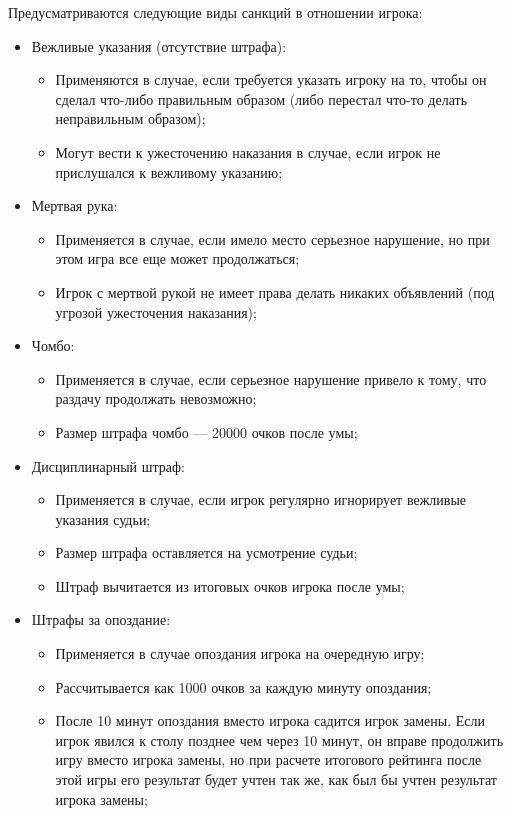 Предусматриваются следующие виды санкций в отношении игрока:
\begin{itemize}
	\item Вежливые указания (отсутствие штрафа):
	\begin{itemize}
		\item Применяются в случае, если требуется указать игроку на то, чтобы он сделал что-либо правильным образом (либо перестал что-то делать неправильным образом);
		\item Могут вести к ужесточению наказания в случае, если игрок не прислушался к вежливому указанию;
	\end{itemize}
	\item Мертвая рука:
	\begin{itemize}
		\item Применяется в случае, если имело место серьезное нарушение, но при этом игра все еще может продолжаться;
		\item Игрок с мертвой рукой не имеет права делать никаких объявлений (под угрозой ужесточения наказания);
	\end{itemize}
	\item Чомбо:
	\begin{itemize}
		\item Применяется в случае, если серьезное нарушение привело к тому, что раздачу продолжать невозможно;
		\item Размер штрафа чомбо --- 20000 очков после умы;
	\end{itemize}
	\item Дисциплинарный штраф:
	\begin{itemize}
		\item Применяется в случае, если игрок регулярно игнорирует вежливые указания судьи;
		\item Размер штрафа оставляется на усмотрение судьи;
		\item Штраф вычитается из итоговых очков игрока после умы;
	\end{itemize}
	\item Штрафы за опоздание:
	\begin{itemize}
		\item Применяется в случае опоздания игрока на очередную игру;
		\item Рассчитывается как 1000 очков за каждую минуту опоздания;
		\item После 10 минут опоздания вместо игрока садится игрок замены. Если игрок явился к столу позднее чем через 10 минут, он вправе продолжить игру вместо игрока замены, но при расчете итогового рейтинга после этой игры его результат будет учтен так же, как был бы учтен результат игрока замены;

\end{itemize}
\end{itemize}
